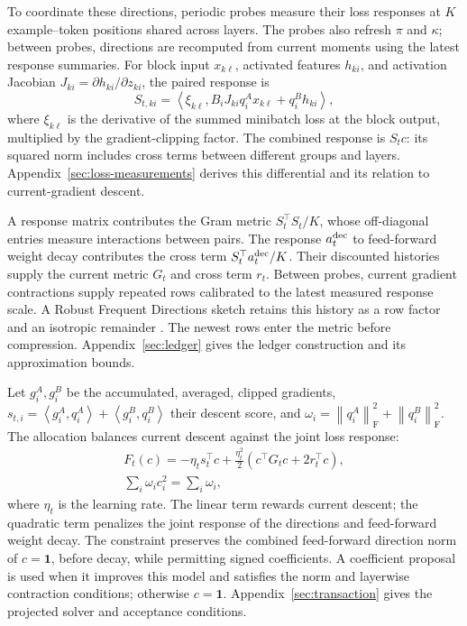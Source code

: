 \documentclass{article}
\newcommand{\frob}[1]{\left\lVert #1\right\rVert_{\mathrm F}}
\newcommand{\inner}[2]{\left\langle #1,#2\right\rangle}
\begin{document}
To coordinate these directions, periodic probes measure their loss
responses at $K$ example--token positions shared across layers.
The probes also refresh $\pi$ and $\kappa$; between probes, directions
are recomputed from current moments using the latest response summaries.
For block input
$x_{k\ell}$, activated features $h_{ki}$, and activation Jacobian
$J_{ki}=\partial h_{ki}/\partial z_{ki}$, the paired response is
\begin{equation}
 S_{t,ki}=\inner{\xi_{k\ell}}
 {B_iJ_{ki}q_i^Ax_{k\ell}+q_i^Bh_{ki}},
 \label{eq:overview-score}
\end{equation}
where $\xi_{k\ell}$ is the derivative of the summed minibatch loss at
the block output, multiplied by the gradient-clipping factor.
The combined response is $S_tc$: its squared norm includes cross
terms between different groups and layers.
Appendix~\ref{sec:loss-measurements} derives this differential and
its relation to current-gradient descent.

A response matrix contributes the Gram metric $S_t^\top S_t/K$,
whose off-diagonal entries measure interactions between pairs.
The response $a_t^{\rm dec}$ to feed-forward weight decay contributes
the cross term $S_t^\top a_t^{\rm dec}/K$.
Their discounted histories supply the current metric $G_t$ and
cross term $r_t$. Between probes, current gradient contractions
supply repeated rows calibrated to the latest measured response scale.
A Robust Frequent Directions sketch retains this history as a row
factor and an isotropic remainder
\citep{ghashami2016frequent,luo2019robust}.
The newest rows enter the metric before compression.
Appendix~\ref{sec:ledger} gives the ledger construction and its
approximation bounds.

Let $g_i^A,g_i^B$ be the accumulated, averaged, clipped gradients,
$s_{t,i}=\inner{g_i^A}{q_i^A}+\inner{g_i^B}{q_i^B}$ their descent
score, and $\omega_i=\frob{q_i^A}^2+\frob{q_i^B}^2$.
The allocation balances current descent against the joint loss response:
\begin{equation}
 \begin{gathered}
 F_t(c)=-\eta_ts_t^\top c+
 \frac{\eta_t^2}{2}(c^\top G_tc+2r_t^\top c),\\
 \sum_i\omega_ic_i^2=\sum_i\omega_i,
 \end{gathered}
 \label{eq:overview-coordinate-model}
\end{equation}
where $\eta_t$ is the learning rate.
The linear term rewards current descent; the quadratic term penalizes
the joint response of the directions and feed-forward weight decay.
The constraint preserves the combined feed-forward direction norm of
$c=\boldsymbol1$, before decay, while permitting signed coefficients.
A coefficient proposal is used when
it improves this model and satisfies the norm and layerwise
contraction conditions; otherwise $c=\boldsymbol1$.
Appendix~\ref{sec:transaction} gives the projected solver and acceptance
conditions.
\end{document}
